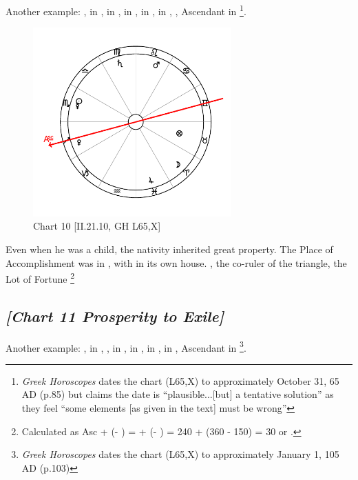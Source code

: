 Another example: \Sun, \Mercury\xspace in \Scorpio, \Moon\xspace in \Aries, \Saturn\xspace in \Virgo, \Jupiter\xspace in \Pisces, \Mars\xspace in \Leo, \Venus, Ascendant in \Sagittarius
\footnote{\textit{Greek Horoscopes} dates the chart (L65,X) to approximately October 31, 65 AD (p.85) but claims the date is ``plausible...[but] a tentative solution'' as they feel ``some elements [as given in the text] must be wrong''}.

\clearpage
\begin{figure}
\centering
\vspace{-20pt}
\includegraphics[width=0.68\textwidth]{charts/2_21_10}
\caption{Chart 10 [II.21.10, GH L65,X]}
\label{fig:chart10}
\end{figure}

Even when he was a child, the nativity inherited great property. The Place of Accomplishment was in \Pisces, with \Jupiter\xspace in its own house. \Venus, the co-ruler of the
triangle, the Lot of Fortune
\footnote{Calculated as Asc + (\Moon\xspace\xspace - \Sun) = \Sagittarius\xspace + (\Aries\xspace - \Virgo) = 240 + (360 - 150) = 30 or \Taurus.}
\clearpage

\newpage
\subsection*{\textit{[Chart 11 Prosperity to Exile]}}

Another example: \Sun, \Mercury\xspace in \Capricorn, \Moon, \Saturn\xspace in \Sagittarius, \Jupiter\xspace in \Cancer, \Mars\xspace in \Virgo, \Venus\xspace in \Aquarius, Ascendant in \Libra
\footnote{\textit{Greek Horoscopes} dates the chart (L65,X) to approximately January 1, 105 AD (p.103)}.

